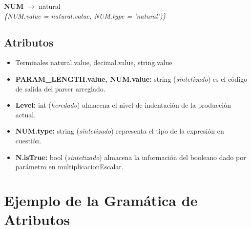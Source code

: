 \documentclass[10pt,a4paper]{article}
\begin{document}
\textbf{NUM} $\rightarrow$ natural \\
\textit{\{NUM.value = natural.value, NUM.type = 'natural')\}}  \\ 

\subsection{Atributos}

\begin{itemize}
\item Terminales natural.value, decimal.value, string.value
\item \textbf{PARAM\_LENGTH.value, NUM.value:} string (\textit{sintetizado}) es el código de salida del parser arreglado.
\item \textbf{Level:} int (\textit{heredado}) almacena el nivel de indentación de la producción actual.
\item \textbf{NUM.type:} string (\textit{sintetizado}) representa el tipo de la expresión en cuestión.
\item \textbf{N.isTrue:} bool (\textit{sintetizado}) almacena la información del booleano dado por parámetro en multiplicacionEscalar.
\end{itemize}

\section{Ejemplo de la Gramática de Atributos}
\end{document}
